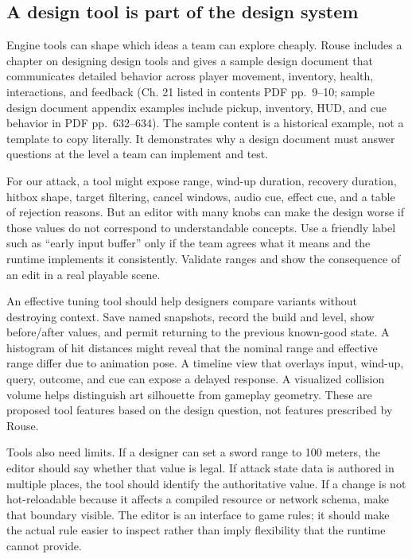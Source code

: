 \subsection{A design tool is part of the design system}\label{06-engine-ii-ch032-a-design-tool-is-part-of-the-design-system}

\hypertarget{06-engine-ii-ch032-a-design-tool-is-part-of-the-design-system}{}

Engine tools can shape which ideas a team can explore cheaply. Rouse includes a chapter on designing design tools and gives a sample design document that communicates detailed behavior across player movement, inventory, health, interactions, and feedback (Ch. 21 listed in contents PDF pp.~9--10; sample design document appendix examples include pickup, inventory, HUD, and cue behavior in PDF pp.~632--634). The sample content is a historical example, not a template to copy literally. It demonstrates why a design document must answer questions at the level a team can implement and test.

For our attack, a tool might expose range, wind-up duration, recovery duration, hitbox shape, target filtering, cancel windows, audio cue, effect cue, and a table of rejection reasons. But an editor with many knobs can make the design worse if those values do not correspond to understandable concepts. Use a friendly label such as ``early input buffer'' only if the team agrees what it means and the runtime implements it consistently. Validate ranges and show the consequence of an edit in a real playable scene.

An effective tuning tool should help designers compare variants without destroying context. Save named snapshots, record the build and level, show before/after values, and permit returning to the previous known-good state. A histogram of hit distances might reveal that the nominal range and effective range differ due to animation pose. A timeline view that overlays input, wind-up, query, outcome, and cue can expose a delayed response. A visualized collision volume helps distinguish art silhouette from gameplay geometry. These are proposed tool features based on the design question, not features prescribed by Rouse.

Tools also need limits. If a designer can set a sword range to 100 meters, the editor should say whether that value is legal. If attack state data is authored in multiple places, the tool should identify the authoritative value. If a change is not hot-reloadable because it affects a compiled resource or network schema, make that boundary visible. The editor is an interface to game rules; it should make the actual rule easier to inspect rather than imply flexibility that the runtime cannot provide.

